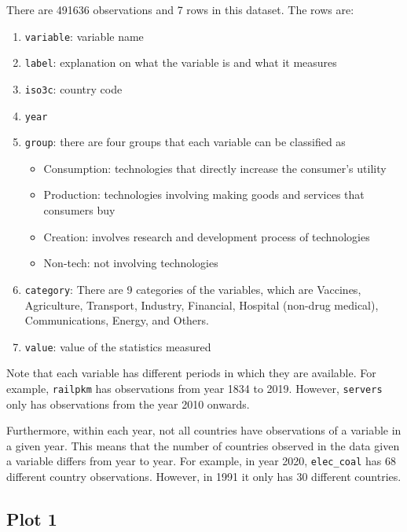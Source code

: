\documentclass[
]{article}
\providecommand{\tightlist}{%
  \setlength{\itemsep}{0pt}\setlength{\parskip}{0pt}}
\begin{document}
There are 491636 observations and 7 rows in this dataset. The rows are:

\begin{enumerate}
\def\labelenumi{\arabic{enumi}.}
\tightlist
\item
  \texttt{variable}: variable name
\item
  \texttt{label}: explanation on what the variable is and what it
  measures
\item
  \texttt{iso3c}: country code
\item
  \texttt{year}
\item
  \texttt{group}: there are four groups that each variable can be
  classified as

  \begin{itemize}
  \tightlist
  \item
    Consumption: technologies that directly increase the consumer's
    utility
  \item
    Production: technologies involving making goods and services that
    consumers buy
  \item
    Creation: involves research and development process of technologies
  \item
    Non-tech: not involving technologies
  \end{itemize}
\item
  \texttt{category}: There are 9 categories of the variables, which are
  Vaccines, Agriculture, Transport, Industry, Financial, Hospital
  (non-drug medical), Communications, Energy, and Others.
\item
  \texttt{value}: value of the statistics measured
\end{enumerate}

Note that each variable has different periods in which they are
available. For example, \texttt{railpkm} has observations from year 1834
to 2019. However, \texttt{servers} only has observations from the year
2010 onwards.

Furthermore, within each year, not all countries have observations of a
variable in a given year. This means that the number of countries
observed in the data given a variable differs from year to year. For
example, in year 2020, \texttt{elec\_coal} has 68 different country
observations. However, in 1991 it only has 30 different countries.

\hypertarget{plot-1}{%
\subsection{Plot 1}\label{plot-1}}
\end{document}
